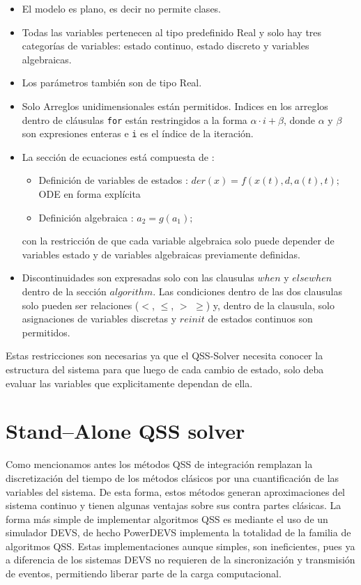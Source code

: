 	\begin{itemize}
	 \item El modelo es plano, es decir no permite clases.
	 \item Todas las variables pertenecen al tipo predefinido Real y solo hay tres categorías de variables: estado continuo, estado discreto y variables 
	algebraicas.
	 \item Los parámetros también son de tipo Real. 
	 \item 
     
    Solo Arreglos unidimensionales están permitidos. Indices en los arreglos dentro de cláusulas \texttt{for} están restringidos a la forma $\alpha \cdot i + \beta$, 
	donde $\alpha$ y $\beta$ son expresiones enteras e \texttt{i} es el índice de la iteración.
	 \item La sección de ecuaciones está compuesta de :
	 \begin{itemize}
		\item Definición de variables de estados : $der(x) =  f (x(t), d, a(t), t);$ ODE en forma explícita
		\item Definición algebraica : $a_2  = g(a_1);$
	 \end{itemize}
	 con la restricción de que cada variable algebraica solo puede depender de variables estado y de variables algebraicas previamente definidas.
	 
	 \item Discontinuidades son expresadas solo con las clausulas $when$ y $elsewhen$ dentro de la sección $algorithm$. Las condiciones dentro de las dos 
	clausulas solo pueden ser relaciones ($<$, $\leqslant$, $>$ $\geqslant$) y, dentro de la clausula, solo asignaciones de variables discretas y $reinit$ 
	de estados continuos son permitidos.
	\end{itemize}

	Estas restricciones son necesarias ya que el QSS-Solver necesita conocer la estructura del sistema para que luego de cada cambio de estado, solo deba evaluar
	las variables que explicitamente dependan de ella.

\section{Stand–Alone QSS solver}
	Como mencionamos antes los métodos QSS de integración remplazan la discretización del tiempo de los métodos clásicos por una cuantificación de las 
	variables del sistema. De esta forma, estos métodos generan aproximaciones del sistema continuo y tienen algunas ventajas sobre sus contra partes clásicas.
	La forma más simple de implementar algoritmos QSS es mediante el uso de un simulador DEVS, de hecho PowerDEVS implementa la totalidad de la familia de 
	algoritmos QSS. Estas implementaciones aunque simples, son ineficientes, pues ya a diferencia de los sistemas DEVS no requieren de la sincronización y 
	transmisión de eventos, permitiendo liberar parte de la carga computacional.

